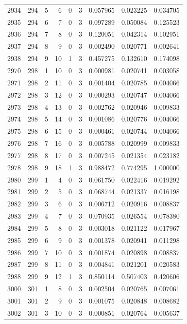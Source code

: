 \begin{longtable}{rrrrrrrrr}
2934 & 294 & 5 & 6 & 0 & 3 & 0.057965 & 0.023225 & 0.034705 \\
2935 & 294 & 6 & 7 & 0 & 3 & 0.097289 & 0.050084 & 0.125523 \\
2936 & 294 & 7 & 8 & 0 & 3 & 0.120051 & 0.042314 & 0.102951 \\
2937 & 294 & 8 & 9 & 0 & 3 & 0.002490 & 0.020771 & 0.002641 \\
2938 & 294 & 9 & 10 & 1 & 3 & 0.457275 & 0.132610 & 0.174098 \\
2970 & 298 & 1 & 10 & 0 & 3 & 0.000981 & 0.020741 & 0.003058 \\
2971 & 298 & 2 & 11 & 0 & 3 & 0.001404 & 0.020785 & 0.004066 \\
2972 & 298 & 3 & 12 & 0 & 3 & 0.000293 & 0.020747 & 0.004066 \\
2973 & 298 & 4 & 13 & 0 & 3 & 0.002762 & 0.020946 & 0.009833 \\
2974 & 298 & 5 & 14 & 0 & 3 & 0.001086 & 0.020776 & 0.004066 \\
2975 & 298 & 6 & 15 & 0 & 3 & 0.000461 & 0.020744 & 0.004066 \\
2976 & 298 & 7 & 16 & 0 & 3 & 0.005788 & 0.020999 & 0.009833 \\
2977 & 298 & 8 & 17 & 0 & 3 & 0.007245 & 0.021354 & 0.023182 \\
2978 & 298 & 9 & 18 & 1 & 3 & 0.988472 & 0.774295 & 1.000000 \\
2980 & 299 & 1 & 4 & 0 & 3 & 0.061750 & 0.022416 & 0.019292 \\
2981 & 299 & 2 & 5 & 0 & 3 & 0.068744 & 0.021337 & 0.016198 \\
2982 & 299 & 3 & 6 & 0 & 3 & 0.006712 & 0.020916 & 0.008837 \\
2983 & 299 & 4 & 7 & 0 & 3 & 0.070935 & 0.026554 & 0.078380 \\
2984 & 299 & 5 & 8 & 0 & 3 & 0.003018 & 0.021122 & 0.017967 \\
2985 & 299 & 6 & 9 & 0 & 3 & 0.001378 & 0.020941 & 0.011298 \\
2986 & 299 & 7 & 10 & 0 & 3 & 0.001874 & 0.020898 & 0.008837 \\
2987 & 299 & 8 & 11 & 0 & 3 & 0.004841 & 0.021201 & 0.020583 \\
2988 & 299 & 9 & 12 & 1 & 3 & 0.850114 & 0.507403 & 0.420606 \\
3000 & 301 & 1 & 8 & 0 & 3 & 0.002504 & 0.020765 & 0.007061 \\
3001 & 301 & 2 & 9 & 0 & 3 & 0.001075 & 0.020848 & 0.008682 \\
3002 & 301 & 3 & 10 & 0 & 3 & 0.000851 & 0.020764 & 0.005637 \\

\end{longtable}
